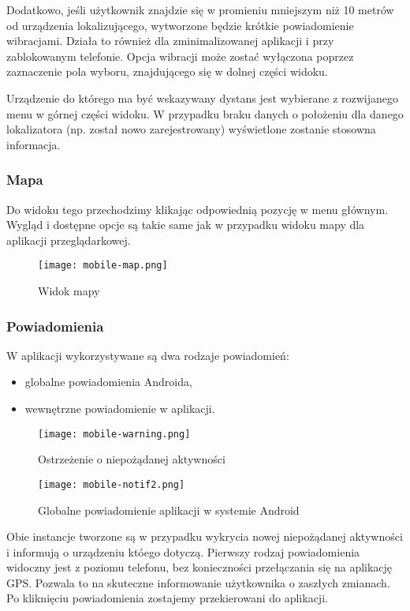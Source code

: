 \documentclass[eng,printmode]{mgr}
\begin{document}
Dodatkowo, jeśli użytkownik znajdzie się w promieniu mniejszym niż 10 metrów od urządzenia lokalizującego, wytworzone będzie krótkie powiadomienie wibracjami. Działa to również dla zminimalizowanej aplikacji i przy zablokowanym telefonie. Opcja wibracji może zostać wyłączona poprzez zaznaczenie pola wyboru, znajdującego się w dolnej części widoku.


Urządzenie do którego ma być wskazywany dystans jest wybierane z rozwijanego menu w górnej części widoku. W przypadku braku danych o położeniu dla danego lokalizatora (np. został nowo zarejestrowany) wyświetlone zostanie stosowna informacja.

\subsubsection{Mapa}
Do widoku tego przechodzimy klikając odpowiednią pozycję w menu głównym. Wygląd i dostępne opcje są takie same jak w przypadku widoku mapy dla aplikacji przeglądarkowej.
\begin{figure}[ht]
\centering
\texttt{[image: mobile-map.png]}
\caption{Widok mapy}
\end{figure}

\subsubsection{Powiadomienia}
W aplikacji wykorzystywane są dwa rodzaje powiadomień:
\begin{itemize}
\item globalne powiadomienia Androida,
\item wewnętrzne powiadomienie w aplikacji.
\end{itemize}

\begin{figure}[ht]
\centering
\texttt{[image: mobile-warning.png]}
\caption{Ostrzeżenie o niepożądanej aktywności}
\end{figure}

\begin{figure}
\centering
\texttt{[image: mobile-notif2.png]}
\caption{Globalne powiadomienie aplikacji w systemie Android}
\end{figure}

Obie instancje tworzone są w przypadku wykrycia nowej niepożądanej aktywności i informują o urządzeniu któego dotyczą. Pierwszy rodzaj powiadomienia widoczny jest z poziomu telefonu, bez konieczności przełączania się na aplikację GPS. Pozwala to na skuteczne informowanie użytkownika o zaszłych zmianach. Po kliknięciu powiadomienia zostajemy przekierowani do aplikacji.
\end{document}
